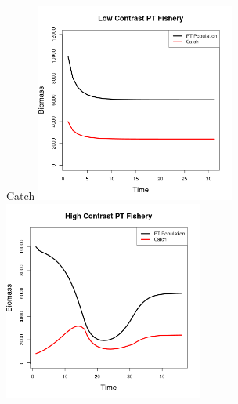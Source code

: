 \documentclass[ xcolor = pdftex, dvipsnames, table ]{beamer}
\begin{document}
%

%
\begin{frame}{\color{orange}Catch}
\includegraphics[width=0.49\textwidth]{../gpBias/bioCatchFlatNoQX2Z0.6.png}
\includegraphics[width=0.49\textwidth]{../gpBias/bioCatchExpT45X2Z0.6.png}
\end{frame}
\end{document}
